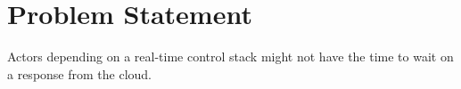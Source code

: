 \section{Problem Statement}

Actors depending on a real-time control stack might not have the time to wait on
a response from the cloud.
